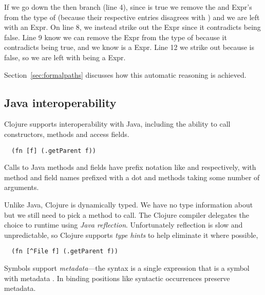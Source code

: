 \begin{exmp}
\inputminted[linenos,firstnumber=1,firstline=15,lastline=27]{clojure}{code/demo/src/demo/hmap.clj}
\label{example:decmap}
\end{exmp}

If we go down the then branch (line 4), since  is true
we remove
the  and 
Expr's from the type of  (because their respective  entries disagrees with )
and we are left with an  Expr.
On line 8,
we instead strike out the  Expr since it contradicts  being false. 
Line 9 know we can
remove the  Expr from the type of  because it contradicts  being true,
and we know  is a  Expr.
Line 12 we strike out  because  is false,
so we are left with  being a  Expr.

Section~\ref{sec:formalpaths} discusses how this automatic reasoning is achieved.

\subsection{Java interoperability}
\label{sec:overviewjavainterop}

Clojure supports interoperability with Java, including the ability to
call constructors, methods and access fields.

\begin{verbatim}
  (fn [f] (.getParent f))
\end{verbatim}

Calls to Java methods and fields have prefix notation
like  and  respectively,
with method and field names prefixed with a dot and methods taking some number of arguments.

Unlike Java, Clojure is dynamically typed. We have no type information about 
but we still need to pick a method to call. The Clojure compiler delegates
the choice to runtime using \emph{Java reflection}.
Unfortunately reflection is slow and unpredictable, so Clojure supports \emph{type hints}
to help eliminate it where possible, 

\begin{verbatim}
  (fn [^File f] (.getParent f))
\end{verbatim}

Symbols support \emph{metadata}---the syntax 
is a single expression that is a symbol  with metadata .
In binding positions like 
syntactic occurrences preserve metadata.

